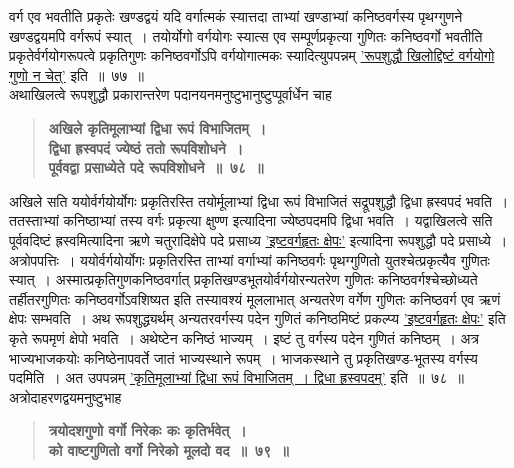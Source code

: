 \documentclass[11pt, openany]{book}
\begin{document}
\begin{sloppypar}
\noindent वर्ग एव भवतीति प्रकृतेः खण्डद्वयं यदि वर्गात्मकं स्यात्तदा ताभ्यां खण्डाभ्यां कनिष्ठवर्गस्य पृथग्गुणने खण्डद्वयमपि वर्गरूपं स्यात्~। तयोर्योगो वर्गयोगः स्यात्स एव सम्पूर्णप्रकृत्या गुणितः कनिष्ठवर्गो भवतीति प्रकृतेर्वर्गयोगरूपत्वे प्रकृतिगुणः कनिष्ठवर्गोऽपि वर्गयोगात्मकः स्यादित्युपपन्नम् \hyperref[6.77]{'रूपशुद्धौ खिलोद्दिष्टं वर्गयोगो गुणो न चेत्'} इति~॥~७७~॥\\

{\small अथाखिलत्वे रूपशुद्धौ प्रकारान्तरेण पदानयनमनुष्टुभानुष्टुप्पूर्वार्धेन चाह\textendash }

 \label{6.78}
\begin{quote}
{\large \textbf{{\color{purple}अखिले कृतिमूलाभ्यां द्विधा रूपं विभाजितम्~।\\
द्विधा ह्रस्वपदं ज्येष्ठं ततो रूपविशोधने~।\\
पूर्ववद्वा प्रसाध्येते पदे रूपविशोधने~॥~७८~॥}}}
\end{quote}

अखिले सति ययोर्वर्गयोर्योगः प्रकृतिरस्ति तयोर्मूलाभ्यां द्विधा रूपं विभाजितं सद्रूपशुद्धौ द्विधा ह्रस्वपदं भवति~। ततस्ताभ्यां कनिष्ठाभ्यां तस्य वर्गः प्रकृत्या क्षुण्ण इत्यादिना ज्येष्ठपदमपि द्विधा भवति~। यद्वाखिलत्वे सति पूर्ववदिष्टं ह्रस्वमित्यादिना ऋणे चतुरादिक्षेपे पदे प्रसाध्य \hyperref[6.72]{'इष्टवर्गहृतः क्षेपः'} इत्यादिना रूपशुद्धौ पदे प्रसाध्ये~। अत्रोपपत्तिः~। ययोर्वर्गयोर्योगः प्रकृतिरस्ति ताभ्यां वर्गाभ्यां कनिष्ठवर्गः पृथग्गुणितो युतश्चेत्प्रकृत्यैव गुणितः स्यात्~। अस्मात्प्रकृतिगुणकनिष्ठवर्गात् प्रकृतिखण्डभूतयोर्वर्गयोरन्यतरेण गुणितः कनिष्ठवर्गश्चेच्छोध्यते तर्हीतरगुणितः कनिष्ठवर्गोऽवशिष्यत इति तस्यावश्यं मूललाभात् अन्यतरेण वर्गेण गुणितः कनिष्ठवर्ग एव ऋणं क्षेपः सम्भवति~। अथ रूपशुद्ध्यर्थम् अन्यतरवर्गस्य पदेन गुणितं कनिष्ठमिष्टं प्रकल्प्य \hyperref[6.72]{'इष्टवर्गहृतः क्षेपः'} इति कृते रूपमृणं क्षेपो भवति~। अथेष्टेन कनिष्ठं भाज्यम्~। इष्टं तु वर्गस्य पदेन गुणितं कनिष्ठम्~। अत्र भाज्यभाजकयोः कनिष्ठेनापवर्ते जातं भाज्यस्थाने रूपम्~। भाजकस्थाने तु प्रकृतिखण्ड-भूतस्य वर्गस्य पदमिति~। अत उपपन्नम् \hyperref[6.78]{'कृतिमूलाभ्यां द्विधा रूपं विभाजितम्~। द्विधा ह्रस्वपदम्'} इति~॥~७८~॥\\

{\small अत्रोदाहरणद्वयमनुष्टुभाह\textendash }

 \label{6.79}
\begin{quote}
{\large \textbf{{\color{purple}त्रयोदशगुणो वर्गो निरेकः कः कृतिर्भवेत्~।\\
को वाष्टगुणितो वर्गो निरेको मूलदो वद~॥~७९~॥}}}
\end{quote}


\end{sloppypar}
\end{document}
